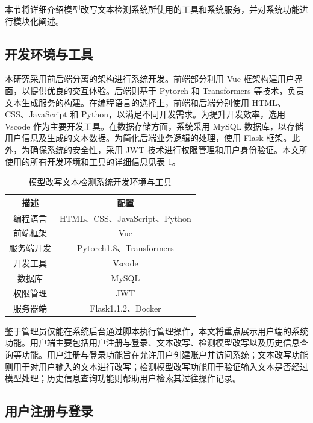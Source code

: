 本节将详细介绍模型改写文本检测系统所使用的工具和系统服务，并对系统功能进行模块化阐述。

\subsection{开发环境与工具}
\label{sec:sys-env}

本研究采用前后端分离的架构进行系统开发。前端部分利用 Vue 框架构建用户界面，以提供优良的交互体验。后端则基于 Pytorch 和 Transformers 等技术，负责文本生成服务的构建。在编程语言的选择上，前端和后端分别使用 HTML、CSS、JavaScript 和 Python，以满足不同开发需求。为提升开发效率，选用 Vscode 作为主要开发工具。在数据存储方面，系统采用 MySQL 数据库，以存储用户信息及生成的文本数据。为简化后端业务逻辑的处理，使用 Flask 框架。此外，为确保系统的安全性，采用 JWT 技术进行权限管理和用户身份验证。本文所使用的所有开发环境和工具的详细信息见表 \ref{tab:sys-env}。

\begin{table}[htbp]
    \centering
    \caption{模型改写文本检测系统开发环境与工具}
    \label{tab:sys-env}
    \begin{tabular}{cc}
        \toprule
        \textbf{描述} & \textbf{配置} \\
        \midrule
        编程语言 & HTML、CSS、JavaScript、Python \\
        前端框架 & Vue \\
        服务端开发 & Pytorch1.8、Transformers \\
        开发工具 & Vscode \\
        数据库 & MySQL \\
        权限管理 & JWT \\
        服务器端 & Flask1.1.2、Docker \\
        \bottomrule
    \end{tabular}
\end{table}

鉴于管理员仅能在系统后台通过脚本执行管理操作，本文将重点展示用户端的系统功能。用户端主要包括用户注册与登录、文本改写、检测模型改写以及历史信息查询等功能。用户注册与登录功能旨在允许用户创建账户并访问系统；文本改写功能则用于对用户输入的文本进行改写；检测模型改写功能用于验证输入文本是否经过模型处理；历史信息查询功能则帮助用户检索其过往操作记录。

\subsection{用户注册与登录}

